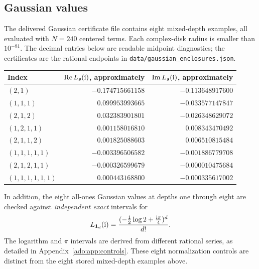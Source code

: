\subsection{Gaussian values}
The delivered Gaussian certificate file contains eight mixed-depth
examples, all evaluated with $N=240$ centered terms. Each complex-disk
radius is smaller than $10^{-81}$. The decimal entries below are
readable midpoint diagnostics; the certificates are the rational
endpoints in \texttt{data/gaussian\_enclosures.json}.
\begin{center}\small
\begin{tabular}{@{}lrr@{}}
\toprule
Index & $\operatorname{Re} L_{\boldsymbol{s}}(\mathrm i)$, approximately
      & $\operatorname{Im} L_{\boldsymbol{s}}(\mathrm i)$, approximately\\
\midrule
$(2,1)$ & $-0.174715661158$ & $-0.113648917600$\\
$(1,1,1)$ & $0.099953993665$ & $-0.033577147847$\\
$(2,1,2)$ & $0.032383901801$ & $-0.026348629072$\\
$(1,2,1,1)$ & $0.001158016810$ & $0.008343470492$\\
$(2,1,1,2)$ & $0.001825088603$ & $0.006510815484$\\
$(1,1,1,1,1)$ & $-0.003396506582$ & $-0.001886779708$\\
$(2,1,2,1,1)$ & $-0.000326599679$ & $-0.000010475684$\\
$(1,1,1,1,1,1)$ & $0.000443168800$ & $-0.000335617002$\\
\bottomrule
\end{tabular}
\end{center}
In addition, the eight all-ones Gaussian values at depths one through
eight are checked against \emph{independent exact} intervals for
\[
 L_{\boldsymbol{1}_d}(\mathrm i)=\frac{(-\tfrac12\log2+\tfrac{\mathrm i\pi}{4})^d}{d!}.
\]
The logarithm and $\pi$ intervals are derived from different rational
series, as detailed in Appendix~\ref{ado:app:controls}. These eight
normalization controls are distinct from the eight stored mixed-depth
examples above.

